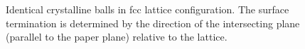 
\begin{figure}\centering
	 \quad
	\caption{Identical crystalline balls in fcc lattice configuration. The surface termination is determined by the direction of the intersecting plane (parallel to the paper plane) relative to the lattice.}
	\label{fig:crystal-termination}
\end{figure}

